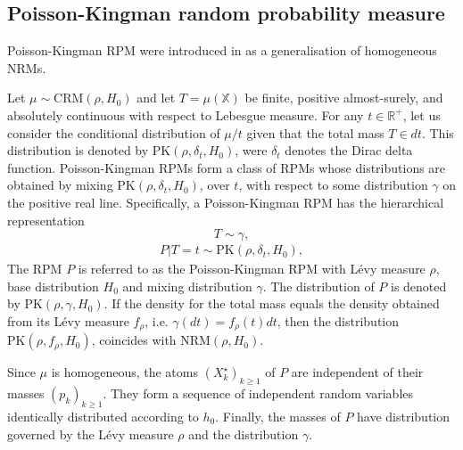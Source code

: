 
\subsection{Poisson-Kingman random probability measure}
Poisson-Kingman \gls{RPM} were introduced in \cite{pitman2003pkp} as a generalisation of homogeneous NRMs. \\

\begin{definition} \label{def:PKRPM}
Let $\mu \sim \text{CRM}(\rho, H_0)$ and let $T = \mu(\mathbb{X})$ be finite, positive almost-surely, and absolutely continuous with respect to Lebesgue measure. For any $t \in \mathbb{R}^+$, let us consider the conditional distribution of $\mu/t$ given that the total mass $T \in dt$. This distribution is denoted by $\text{PK}(\rho, \delta_t , H_0)$, were $\delta_t$ denotes the Dirac delta function. Poisson-Kingman \glspl{RPM} form a class of \glspl{RPM} whose distributions are obtained by mixing $\text{PK}(\rho, \delta_t , H_0)$, over $t$, with respect to some distribution  $\gamma$ on the positive real line. Specifically, a Poisson-Kingman \gls{RPM} has the hierarchical representation
$$T \sim \gamma, $$
\vspace{-2em}
\begin{gather} \label{eq:PK}
P|T=t \sim \text{PK}(\rho, \delta_t, H_0),
\end{gather}
The \gls{RPM} $P$ is referred to as the Poisson-Kingman \gls{RPM} with Lévy measure $\rho$, base distribution $H_0$ and mixing distribution $\gamma$. The distribution of $P$ is denoted by $\text{PK}(\rho, \gamma , H_0)$. If the density for the total mass equals the density obtained from its Lévy measure $f_\rho$, i.e. $\gamma(dt) = f_\rho(t) dt$, then the distribution $\text{PK}(\rho, f_\rho , H_0)$, coincides with $\text{NRM} (\rho, H_0)$.
\end{definition}

Since $\mu$ is homogeneous, the atoms $\left(X^\star_k \right)_{k \ge 1}$ of $P$ are independent of their masses $\left(p_k \right)_{k \ge 1}$. They form a sequence of independent random variables identically distributed according to $h_0$. Finally, the masses of $P$ have distribution governed by the Lévy measure $\rho$ and the distribution $\gamma$.

